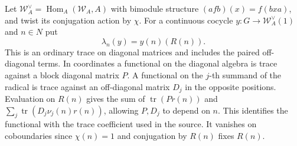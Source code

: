 \documentclass[a4paper,11pt]{article}
\theoremstyle{definition}
\theoremstyle{remark}
\numberwithin{equation}{section}
\begin{document}
Let \(\mathcal W_A^\vee=\operatorname{Hom}_A(\mathcal W_A,A)\)
with bimodule structure \((afb)(x)=f(bxa)\), and twist its
conjugation action by \(\chi\). For a continuous cocycle
\(y:G\to\mathcal W_A^\vee(1)\) and \(n\in N\) put
\[
                   \lambda_n(y)=y(n)(R(n)).
\]
This is an ordinary trace on diagonal matrices and includes
the paired off-diagonal terms. In coordinates a functional
on the diagonal algebra is trace against a block diagonal
matrix \(P\). A functional on the \(j\)-th summand of the
radical is trace against an off-diagonal matrix \(D_j\) in
the opposite positions. Evaluation on \(R(n)\) gives the
sum of \(\operatorname{tr}(P r(n))\) and
\(\sum_j\operatorname{tr}(D_j\nu_j(n)r(n))\), allowing
\(P,D_j\) to depend on \(n\). This identifies the functional
with the trace coefficient used in the source. It vanishes
on coboundaries since \(\chi(n)=1\) and conjugation by
\(R(n)\) fixes \(R(n)\).
\end{document}

